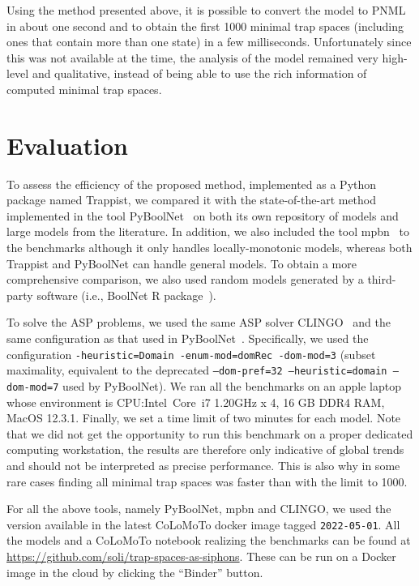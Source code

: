 \documentclass[preprint,12pt]{elsarticle}
\begin{document}
Using the method presented above, it is possible to convert the model to PNML in about one second and to obtain the first 1000 minimal trap spaces (including ones that contain more than one state) in a few milliseconds.
Unfortunately since this was not available at the time, the analysis of the model remained very high-level and qualitative, instead of being able to use the rich information of computed minimal trap spaces.

\section{Evaluation}%
\label{sec:eval}

To assess the efficiency of the proposed method, implemented as a Python package named Trappist, we compared it with the state-of-the-art method implemented in the tool PyBoolNet~\cite{klarner2015computing,klarner2017pyboolnet} on both its own repository of models and large models from the literature.
In addition, we also included the tool mpbn~\cite{Paulev2020} to the benchmarks although it only handles locally-monotonic models, whereas both Trappist and PyBoolNet can handle general models.
To obtain a more comprehensive comparison, we also used random models generated by a third-party software (i.e., BoolNet R package~\cite{mussel2010boolnet}).

To solve the ASP problems, we used the same ASP solver CLINGO~\cite{DBLP:journals/aicom/GebserKKOSS11} and the same configuration as that used in PyBoolNet~\cite{klarner2015computing,klarner2017pyboolnet}.
Specifically, we used the configuration \texttt{-heuristic=Domain -enum-mod=domRec -dom-mod=3} (subset maximality, equivalent to the deprecated \texttt{--dom-pref=32 --heuristic=domain --dom-mod=7} used by PyBoolNet). We ran all the benchmarks on an apple laptop whose environment is CPU:\@ Intel\textregistered\ Core\texttrademark\ i7 1.20GHz x 4, 16 GB DDR4 RAM, MacOS 12.3.1. Finally, we set a time limit of two minutes for each model.
Note that we did not get the opportunity to run this benchmark on a proper dedicated computing workstation, the results are therefore only indicative of global trends and should not be interpreted as precise performance.
This is also why in some rare cases finding all minimal trap spaces was faster than with the limit to 1000.

For all the above tools, namely PyBoolNet, mpbn and CLINGO, we used the version available in the latest CoLoMoTo docker image tagged \texttt{2022-05-01}.
All the models and a CoLoMoTo notebook realizing the benchmarks can be found at \url{https://github.com/soli/trap-spaces-as-siphons}. These can be run on a Docker image in the cloud by clicking the ``Binder'' button.
\end{document}
